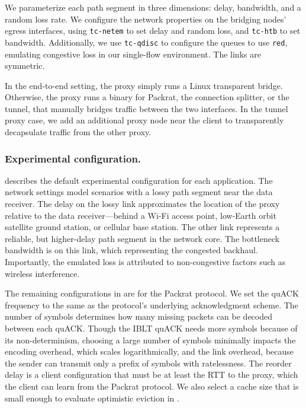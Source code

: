 We parameterize each path segment in three dimensions: delay, bandwidth, and a
random loss rate. We configure the network properties on the bridging nodes’
egress interfaces, using \texttt{tc-netem} to set delay and random loss,
and \texttt{tc-htb} to set bandwidth. Additionally, we use \texttt{tc-qdisc} to
configure the queues to use \texttt{red}, emulating congestive loss in our
single-flow environment. The links are symmetric.

In the end-to-end setting, the proxy simply runs a Linux transparent bridge.
Otherwise, the
proxy runs a binary for Packrat, the connection splitter, or the tunnel, that
manually bridges traffic between the two interfaces.
In the tunnel proxy case, we add an additional proxy
node near the client to transparently decapsulate traffic from the other
proxy.

\subsubsection{Experimental configuration.}



 describes the default experimental configuration
for each application. The network settings model scenarios with a lossy path
segment near the data receiver. The delay on the lossy link approximates the
location of the proxy relative to the data receiver---behind a Wi-Fi access
point, low-Earth orbit satellite ground station, or cellular base station.
The other link represents a reliable, but higher-delay path segment in the
network core. The bottleneck bandwidth is on this link, which
representing the congested backhaul. Importantly, the emulated loss is
attributed to non-congestive factors such as wireless interference.

The remaining configurations in  are for the Packrat
protocol. We set the quACK frequency to the same as the protocol's underlying
acknowledgment scheme. The number of symbols determines how many missing
packets can be decoded between each quACK. Though the IBLT quACK needs more symbols
because of its non-determinism, choosing a large number of symbols minimally
impacts the encoding overhead, which scales logarithmically, and the link
overhead, because the sender can transmit only a prefix of symbols
with ratelessness.
The reorder delay is a client configuration that
must be at least the RTT to the proxy, which the client can learn from the Packrat
protocol. We also select a cache size that is small enough to evaluate
optimistic eviction in .

